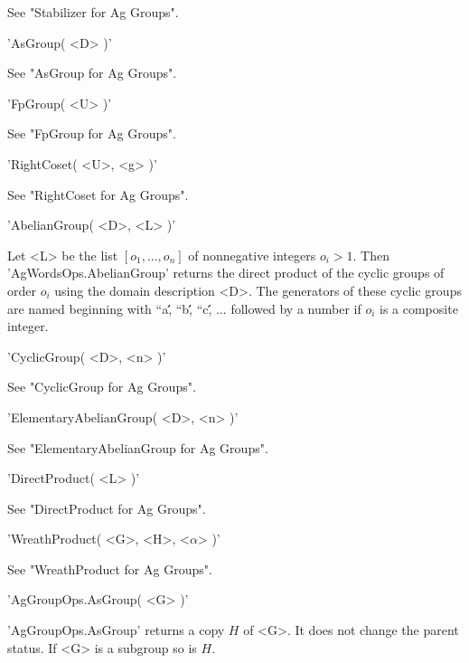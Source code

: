 See "Stabilizer for Ag Groups".

\vspace{5mm}
'AsGroup( <D> )'%

See "AsGroup for Ag Groups".

\vspace{5mm}
'FpGroup( <U> )'%

See "FpGroup for Ag Groups".

\vspace{5mm}
'RightCoset( <U>, <g> )'%

See "RightCoset for Ag Groups".

\vspace{5mm}
'AbelianGroup( <D>, <L> )'%

Let <L> be the list $[o_1, ..., o_n]$ of nonnegative integers $o_i  > 1$.
Then 'AgWordsOps.AbelianGroup' returns the  direct product of  the cyclic
groups of order  $o_i$ using  the domain description <D>.  The generators
of these cyclic   groups  are named beginning  with   ``a\'\',   ``b\'\',
``c\'\', ...  followed by a number if $o_i$ is a composite integer.

\vspace{5mm}
'CyclicGroup( <D>, <n> )'%

See "CyclicGroup for Ag Groups".

\vspace{5mm}
'ElementaryAbelianGroup( <D>, <n> )'%

See "ElementaryAbelianGroup for Ag Groups".

\vspace{5mm}
'DirectProduct( <L> )'%

See "DirectProduct for Ag Groups".

\vspace{5mm}
'WreathProduct( <G>, <H>, <$\alpha$> )'%

See "WreathProduct for Ag Groups".


'AgGroupOps.AsGroup( <G> )'

'AgGroupOps.AsGroup' returns a  copy $H$ of  <G>. It does  not change the
parent status. If <G> is a subgroup so is $H$.


